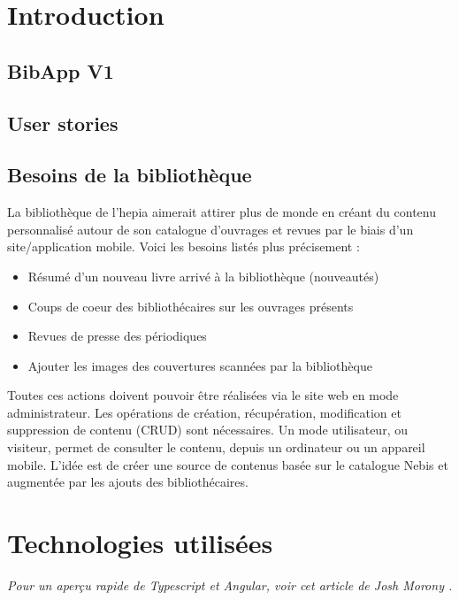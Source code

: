 \documentclass[a4paper, 12pt]{article}
\begin{document}
\newpage

\tableofcontents
\newpage
\listoffigures
\renewcommand\listoflistingscaption{Table des listings de code source}
\listoflistings
\newpage

\section{Introduction}
\subsection{BibApp V1}
\subsection{User stories}
\subsection{Besoins de la bibliothèque}
La bibliothèque de l'hepia aimerait attirer plus de monde en créant du contenu personnalisé autour de son
catalogue d'ouvrages et revues par le biais d'un site/application mobile. Voici les besoins listés plus
précisement :
\begin{itemize}
    \item Résumé d'un nouveau livre arrivé à la bibliothèque (nouveautés)
    \item Coups de coeur des bibliothécaires sur les ouvrages présents
    \item Revues de presse des périodiques
    \item Ajouter les images des couvertures scannées par la bibliothèque
\end{itemize}
Toutes ces actions doivent pouvoir être réalisées via le site web en mode administrateur. Les opérations de
création, récupération, modification et suppression de contenu (CRUD) sont nécessaires. Un mode utilisateur, ou visiteur,
permet de consulter le contenu, depuis un ordinateur ou un appareil mobile. L'idée est de créer une source
de contenus basée sur le catalogue Nebis et augmentée par les ajouts des bibliothécaires.

\section{Technologies utilisées}
\textit{Pour un aperçu rapide de Typescript et Angular, voir cet article de Josh Morony \cite{ref30}.}
\end{document}
